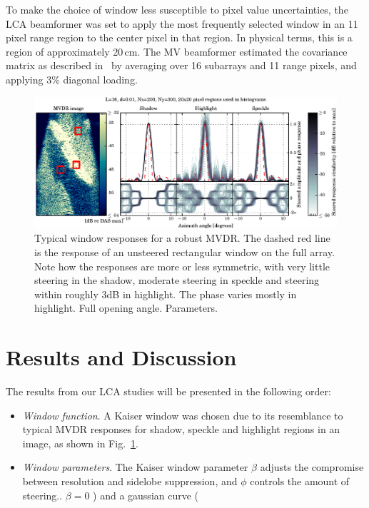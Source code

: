 \documentclass[10pt,journal,draftclsnofoot,onecolumn]{IEEEtran}
\let\MYoriglatexcaption\caption               %
\renewcommand{\caption}[2][\relax]{\MYoriglatexcaption[#2]{#2}}
\newcommand\Fig[1]{Fig.~\ref{#1}}
\newcommand\1{\vec 1}
\begin{document}
To make the choice of window less susceptible to pixel value uncertainties, the LCA beamformer was set to apply the most frequently selected window in an 11 pixel range region to the center pixel in that region. In physical terms, this is a region of approximately 20\,cm. The MV beamformer estimated the covariance matrix as described in~\cite{syn07} by averaging over 16 subarrays and 11 range pixels, and applying 3\% diagonal loading.



\begin{figure}[tbhp!]\centering%
\includegraphics[width=\linewidth]{gfx/mvdr_selected_windows.eps}%
\caption{Typical window responses for a robust MVDR. The dashed red line is the response of an unsteered rectangular window on the full array. Note how the responses are more or less symmetric, with very little steering in the shadow, moderate steering in speckle and steering within roughly 3dB in highlight. The phase varies mostly in highlight. Full opening angle. Parameters. }\label{mvdr_selected_windows}
\end{figure}

\newpage



\section{Results and Discussion}

The results from our LCA studies will be presented in the following order:

\begin{itemize}
\item \emph{Window function}. A Kaiser window was chosen due to its resemblance to typical MVDR responses for shadow, speckle and highlight regions in an image, as shown in \Fig{mvdr_selected_windows}.
\item \emph{Window parameters}. The Kaiser window parameter $\beta$ adjusts the compromise between resolution and sidelobe suppression, and $\phi$ controls the amount of steering.. $\beta=0$ ) and a gaussian curve (
\end{itemize}
\end{document}
